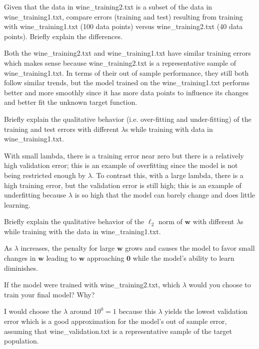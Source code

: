 \begin{solution}
\end{solution}

\problem[4]
Given that the data in wine\_training2.txt is a subset of the data in wine\_training1.txt, compare errors (training and test) resulting from training with wine\_training1.txt (100 data points) versus wine\_training2.txt (40 data points). Briefly explain the differences.

\begin{solution}
  Both the wine_training2.txt and wine_training1.txt have similar training errors which makes sense because wine_training2.txt is a representative sample of wine_training1.txt. In terms of their out of sample performance, they still both follow similar trends, but the model trained on the wine_training1.txt performs better and more smoothly since it has more data points to influence its changes and better fit the unknown target function. 
\end{solution}

\problem[4]
Briefly explain the qualitative behavior (i.e. over-fitting and under-fitting) of the training and test errors with different $\lambda$s while training with data in wine\_training1.txt.

\begin{solution}
  With small lambda, there is a training error near zero but there is a relatively high validation error; this is an example of overfitting since the model is not being restricted enough by $\lambda$. To contrast this, with a large lambda, there is a high training error, but the validation error is still high; this is an example of underfitting because $\lambda$ is so high that the model can barely change and does little learning.
\end{solution}

\problem[4]
Briefly explain the qualitative behavior of the $\ell_2$ norm of $\textbf{w}$ with different $\lambda$s while training with the data in wine\_training1.txt.

\begin{solution}
  As $\lambda$ increases, the penalty for large $\mathbf{w}$ grows and causes the model to favor small changes in $\mathbf{w}$ leading to $\mathbf{w}$ approaching $\mathbf{0}$ while the model's ability to learn diminishes.
\end{solution}

\problem[4]
If the model were trained with wine\_training2.txt, which $\lambda$ would you choose to train your final model? Why?

\begin{solution}
  I would choose the $\lambda$ around $10^0 = 1$ because this $\lambda$ yields the lowest validation error which is a good approximation for the model's out of sample error, assuming that wine_validation.txt is a representative sample of the target population.
\end{solution}

